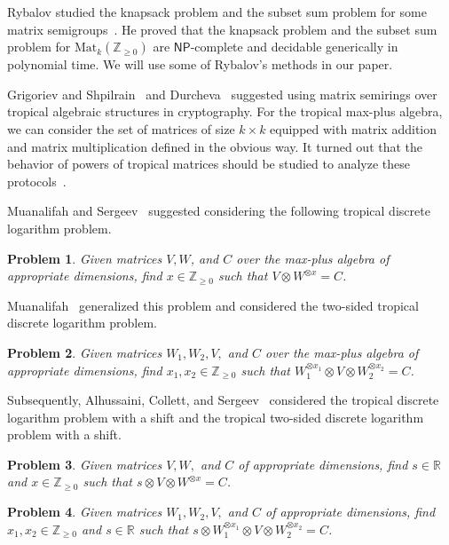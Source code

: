 \documentclass[reqno,12pt]{amsart}
\newtheorem{problem}{Problem}
\theoremstyle{definition}
\newcommand{\Mat}{\mathrm{Mat}}
\newcommand{\NP}{\mathsf{NP}}
\begin{document}
Rybalov studied the knapsack problem and the subset sum problem for some matrix semigroups~\cite{Rybalov2023,Rybalov2020, Rybalov2020_2}. He proved that the knapsack problem and the subset sum problem for $\Mat_k(\mathbb{Z}_{\geq0})$ are $\NP$-complete and decidable generically in polynomial time. We will use some of Rybalov's methods in our paper.

Grigoriev and Shpilrain~\cite{GrigorievShpilrain2014,GrigorievShpilrain2019} and Durcheva~\cite{Durcheva2014} suggested using matrix semirings over tropical algebraic structures in cryptography.
For the tropical max-plus algebra, we can consider the set of matrices of size $k\times k$ equipped with matrix addition and matrix multiplication defined in the obvious way. 
It turned out that the behavior of powers of tropical matrices should be studied to analyze these protocols~\cite{KotovUshakov2018,IsaacKahrobaei2021, BuchinskiyKotovTreier2023_2, BuchinskiyKotovTreier2023_1, BuchinskiyKotovTreier2024}.

Muanalifah and Sergeev~\cite{MuanalifahSergeev2022} suggested considering the following tropical discrete logarithm problem.
\begin{problem}
    Given matrices $V, W$, and $C$ over the max-plus algebra of appropriate dimensions, find $x \in \mathbb{Z}_{\geq 0}$ such that $V \otimes W^{\otimes x} = C$.
\end{problem}

Muanalifah~\cite{Muanalifah2022} generalized this problem and considered the two-sided tropical discrete logarithm problem.
\begin{problem}
    Given matrices $W_1, W_2, V,$ and $C$ over the max-plus algebra of appropriate dimensions, find $x_1, x_2 \in \mathbb{Z}_{\geq 0}$ such that $W_1^{\otimes x_1} \otimes V \otimes W_2^{\otimes x_2} = C$.
\end{problem}

Subsequently, Alhussaini, Collett, and Sergeev~\cite{AlhussainiCollettSergeev2024} considered the tropical discrete logarithm problem with a shift and the tropical two-sided discrete logarithm problem with a shift.
\begin{problem}
    Given matrices $V, W,$ and $C$ of appropriate dimensions, find $s \in \mathbb{R}$ and $x \in \mathbb{Z}_{\geq 0}$ such that $s \otimes V \otimes W^{\otimes x} = C$.
\end{problem}
\begin{problem}
    Given matrices $W_1, W_2, V,$ and $C$ of appropriate dimensions, find $x_1, x_2 \in \mathbb{Z}_{\geq 0}$ and $s \in \mathbb{R}$ such that $s \otimes W_1^{\otimes x_1} \otimes V \otimes W_2^{\otimes x_2} = C$.
\end{problem}
\end{document}
